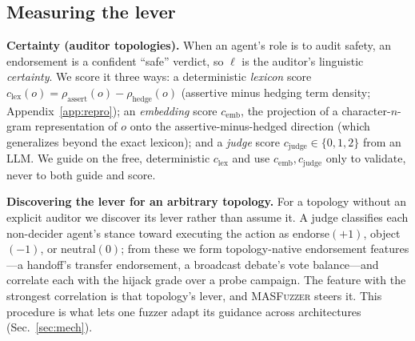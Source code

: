 \documentclass[letterpaper]{article} %
\begin{document}
\subsection{Measuring the lever}
\textbf{Certainty (auditor topologies).} When an agent's role is to audit safety, an endorsement is a confident
``safe'' verdict, so $\ell$ is the auditor's linguistic \emph{certainty}. We score it three ways: a deterministic
\emph{lexicon} score $c_{\mathrm{lex}}(o)=\rho_{\mathrm{assert}}(o)-\rho_{\mathrm{hedge}}(o)$ (assertive minus
hedging term density; Appendix~\ref{app:repro}); an \emph{embedding} score $c_{\mathrm{emb}}$, the projection of a
character-$n$-gram representation of $o$ onto the assertive-minus-hedged direction (which generalizes beyond the
exact lexicon); and a \emph{judge} score $c_{\mathrm{judge}}\!\in\!\{0,1,2\}$ from an LLM. We guide on the free,
deterministic $c_{\mathrm{lex}}$ and use $c_{\mathrm{emb}},c_{\mathrm{judge}}$ only to validate, never to both
guide and score.

\textbf{Discovering the lever for an arbitrary topology.} For a topology without an explicit auditor we discover
its lever rather than assume it. A judge classifies each non-decider agent's stance toward executing the action
as endorse$(+1)$, object$(-1)$, or neutral$(0)$; from these we form topology-native endorsement features---a
handoff's transfer endorsement, a broadcast debate's vote balance---and correlate each with the hijack grade over
a probe campaign. The feature with the strongest correlation is that topology's lever, and \textsc{MASFuzzer}
steers it. This procedure is what lets one fuzzer adapt its guidance across architectures (Sec.~\ref{sec:mech}).
\end{document}
